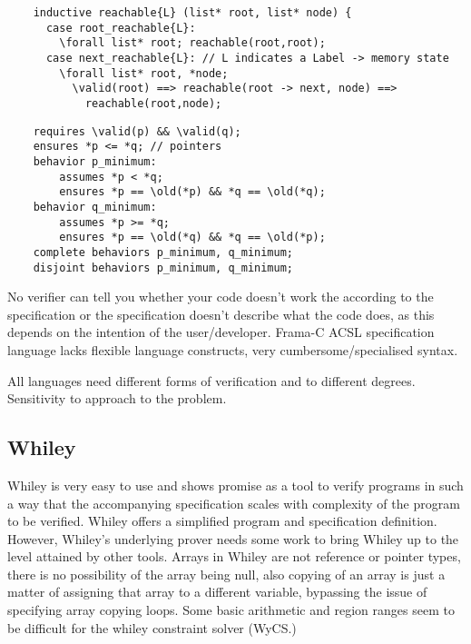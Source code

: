 \documentclass[10pt]{article} %
\begin{document}
\begin{lstlisting}
	inductive reachable{L} (list* root, list* node) {
	  case root_reachable{L}:
	    \forall list* root; reachable(root,root);
	  case next_reachable{L}: // L indicates a Label -> memory state
	    \forall list* root, *node;
	      \valid(root) ==> reachable(root -> next, node) ==>
	        reachable(root,node);
\end{lstlisting}
\begin{lstlisting}
	requires \valid(p) && \valid(q);
	ensures *p <= *q; // pointers
	behavior p_minimum:
		assumes *p < *q;
		ensures *p == \old(*p) && *q == \old(*q);
	behavior q_minimum:
		assumes *p >= *q;
		ensures *p == \old(*q) && *q == \old(*p);
	complete behaviors p_minimum, q_minimum;
	disjoint behaviors p_minimum, q_minimum;
\end{lstlisting}

No verifier can tell you whether your code doesn't work the according to the specification or the specification doesn't describe what the code does, as this depends on the intention of the user\slash developer.
Frama-C ACSL specification language lacks flexible language constructs, very cumbersome\slash specialised syntax.

All languages need different forms of verification and to different degrees. Sensitivity to approach to the problem.
\subsection{Whiley}
	Whiley is very easy to use and shows promise as a tool to verify programs in such a way that the accompanying specification scales with complexity of the program to be verified. Whiley offers a simplified program and specification definition. However, Whiley's underlying prover needs some work to bring Whiley up to the level attained by other tools. Arrays in Whiley are not reference or pointer types, there is no possibility of the array being null, also copying of an array is just a matter of assigning that array to a different variable, bypassing the issue of specifying array copying loops. Some basic arithmetic and region ranges seem to be difficult for the whiley constraint solver (WyCS.)
\end{document}
